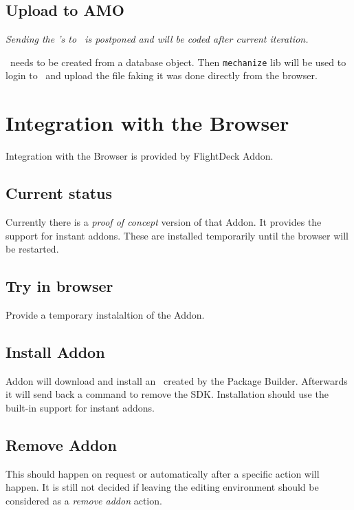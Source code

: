 \documentclass[10pt]{article}
\begin{document}
	\subsection{Upload to AMO}
	
		{\em Sending the \xpi's to \amo\ is postponed and will be coded after current iteration.}
	
		\noindent \xpi\ needs to be created from a database object. Then {\tt mechanize} lib will
		be used to login to \amo\ and upload the file faking it was done directly from the browser.
							
\section{Integration with the Browser}

	Integration with the Browser is provided by FlightDeck Addon.

	\subsection{Current status}
	
		Currently there is a {\em proof of concept} version of that Addon. It provides the support for instant 
		addons. These are installed temporarily until the browser will be restarted.
		
	\subsection{Try in browser}
	
		Provide a temporary instalaltion of the Addon.
		
		\subsection*{Install Addon}
		
			Addon will download and install an \xpi\ created by the Package Builder. Afterwards it will send
			back a command to remove the SDK. Installation should use the built-in support for instant addons.
		
		\subsection*{Remove Addon}
		
			This should happen on request or automatically after a specific action will happen. It is still
			not decided if leaving the editing environment should be considered as a {\em remove addon} 
			action.
			
\end{document}
